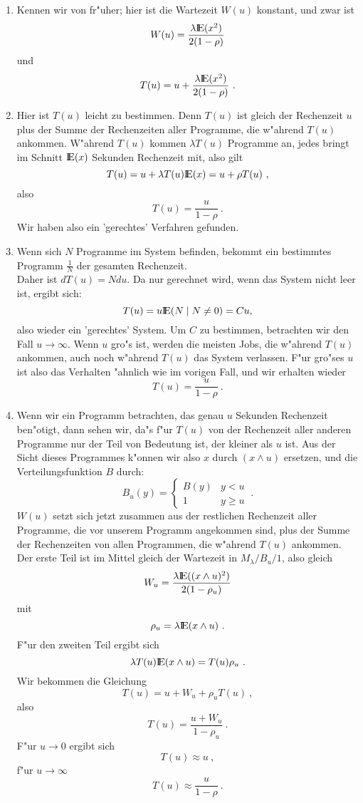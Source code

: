 \begin{enumerate}
\item Kennen wir von fr"uher; hier ist die Wartezeit $W(u)$ konstant, und zwar ist
\[W(u) = \frac{\lambda {\rm I\kern-0.2em E}(x^{2})}{2(1-\rho)} \]
und
\[T(u) = u + \frac{\lambda {\rm I\kern-0.2em E}(x^{2})}{2(1-\rho)} ~.  \]
\item Hier ist $T(u)$ leicht zu bestimmen. Denn $T(u)$ ist gleich der Rechenzeit $u$ plus der Summe der Rechenzeiten aller Programme, die w"ahrend $T(u)$
ankommen.
W"ahrend $T(u)$ kommen $\lambda T(u)$ Programme an, jedes bringt im Schnitt ${\rm I\kern-0.2em E}(x)$ Sekunden Rechenzeit mit, also gilt
\[T(u) = u + \lambda T(u){\rm I\kern-0.2em E}(x)=u + \rho T(u) ~,\]
also
\[T(u)=\frac{u}{1-\rho} ~. \]
Wir haben also ein 'gerechtes' Verfahren gefunden.
\item Wenn sich $N$ Programme im System befinden, bekommt ein bestimmtes Programm $\frac{1}{N}$ der gesamten Rechenzeit. \\
Daher ist $dT(u) = Ndu$. Da nur gerechnet wird, wenn das System nicht leer ist, ergibt sich:
\[ T(u)=u{\rm I\kern-0.2em E}(N \mid N \not= 0)=Cu, \]
also wieder ein 'gerechtes' System. Um $C$ zu bestimmen, betrachten wir den Fall $u \rightarrow \infty$. Wenn $u$ gro"s ist, werden die meisten Jobs, die w"ahrend
$T(u)$ ankommen, auch noch w"ahrend $T(u)$ das System verlassen. F"ur gro"ses $u$ ist also das Verhalten "ahnlich wie im vorigen Fall, und wir erhalten wieder
\[T(u)=\frac{u}{1-\rho} ~. \]
\item Wenn wir ein Programm betrachten, das genau $u$ Sekunden Rechenzeit ben"otigt, dann sehen wir, da"s f"ur $T(u)$ von der Rechenzeit aller anderen Programme
nur der Teil von Bedeutung ist, der kleiner als $u$ ist. Aus der Sicht dieses Programmes k"onnen wir also $x$ durch $(x \land u)$ ersetzen, und die
Verteilungsfunktion $B$ durch:
\[
B_{u}(y) =  \left\{
\begin{array}{lc}
B(y) & y<u \\
1 & y \geq u
\end{array} \right. ~.
\] 
$W(u)$ setzt sich jetzt zusammen aus der restlichen Rechenzeit aller Programme, die vor unserem Programm angekommen sind, plus der Summe der Rechenzeiten von
allen Programmen, die w"ahrend $T(u)$ ankommen. Der erste Teil ist im Mittel gleich der Wartezeit in $M_{\lambda}/B_{u}/1$, also gleich
\[W_{u}=\frac{\lambda {\rm I\kern-0.2em E}((x \land u)^{2})}{2(1-\rho _{u})}  \]
mit
\[\rho _{u}=\lambda {\rm I\kern-0.2em E}(x \wedge u) ~.\]
F"ur den zweiten Teil ergibt sich
\[\lambda T(u){\rm I\kern-0.2em E}(x \wedge u) = T(u)\rho _{u} ~.\]
Wir bekommen die Gleichung
\[T(u)=u+W_{u}+\rho _{u}T(u) ~,  \]
also
\[T(u)=\frac{u+W_{u}}{1-\rho_{u}} ~. \]
F"ur $u \rightarrow 0$ ergibt sich
\[T(u) \approx u ~, \]
f"ur $u \rightarrow \infty$
\[T(u) \approx \frac{u}{1-\rho} ~. \]
\end{enumerate}
 
